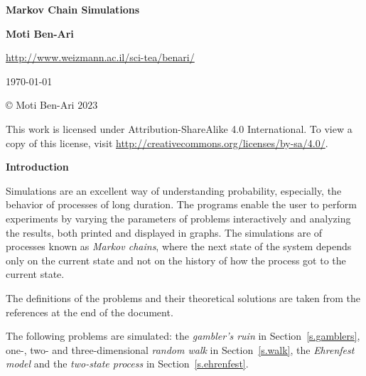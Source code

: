 

\thispagestyle{empty}

\begin{center}
\textbf{\LARGE Markov Chain Simulations}

\bigskip
\bigskip
\bigskip

\textbf{\Large Moti Ben-Ari}

\bigskip

\url{http://www.weizmann.ac.il/sci-tea/benari/}

\bigskip
\bigskip
\bigskip

\today

\end{center}

\vfill

\begin{center}
\copyright{} Moti Ben-Ari $2023$
 \end{center}
 
\begin{small}
This work is licensed under Attribution-ShareAlike 4.0 International. To view a copy of this license, visit \url{http://creativecommons.org/licenses/by-sa/4.0/}.
\end{small}
\newpage

\tableofcontents

\newpage

\begin{center}
\textbf{\LARGE Introduction}
\end{center}


\bigskip

Simulations are an excellent way of understanding probability, especially, the behavior of processes of long duration. The programs enable the user to perform experiments by varying the parameters of problems interactively and analyzing the results, both printed and displayed in graphs. The simulations are of processes known as \emph{Markov chains}, where the next state of the system depends only on the current state and not on the history of how the process got to the current state. 

The definitions of the problems and their theoretical solutions are taken from the references at the end of the document.

\nocite{*}

The following problems are simulated: the \emph{gambler's ruin} in 
Section~\ref{s.gamblers}, one-, two- and three-dimensional \emph{random walk} in Section~\ref{s.walk}, the \emph{Ehrenfest model} and the \emph{two-state process} in Section~\ref{s.ehrenfest}.

